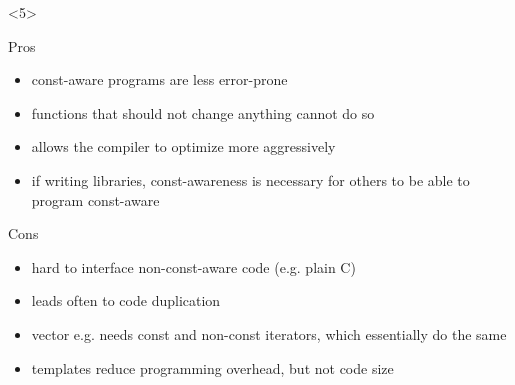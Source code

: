 \documentclass{slides}
\begin{document}
\begin{frame}[fragile]
  \begin{onlyenv}<5>
    \begin{block}{Pros}
      \vspace{-\bigskipamount}
      \begin{itemize}
      \item const-aware programs are less error-prone
      \item functions that should not change anything cannot do so
      \item allows the compiler to optimize more aggressively
      \item if writing libraries, const-awareness is necessary for
        others to be able to program const-aware
      \end{itemize}
    \end{block}

    \begin{block}{Cons}
      \vspace{-\bigskipamount}
      \begin{itemize}
      \item hard to interface non-const-aware code (e.g. plain C)
      \item leads often to code duplication
      \item vector e.g. needs const and non-const iterators, which
        essentially do the same
      \item templates reduce programming overhead, but not
        code size
      \end{itemize}
    \end{block}
  \end{onlyenv}
\end{frame}
\end{document}
